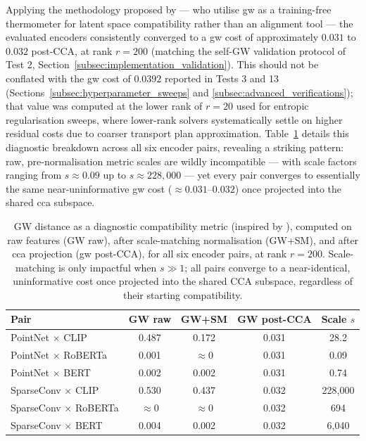 Applying the methodology proposed by \textcite{li2026scale} --- who utilise \gls{gw} as a training-free thermometer for latent space compatibility rather than an alignment tool --- the evaluated encoders consistently converged to a \gls{gw} cost of approximately $0.031$ to $0.032$ post-CCA, at rank $r=200$ (matching the self-GW validation protocol of Test 2, Section~\ref{subsec:implementation_validation}). This should not be conflated with the \gls{gw} cost of $0.0392$ reported in Tests 3 and 13 (Sections~\ref{subsec:hyperparameter_sweeps} and \ref{subsec:advanced_verifications}); that value was computed at the lower rank of $r=20$ used for entropic regularisation sweeps, where lower-rank solvers systematically settle on higher residual costs due to coarser transport plan approximation. Table~\ref{tab:gw-diagnostic} details this diagnostic breakdown across all six encoder pairs, revealing a striking pattern: raw, pre-normalisation metric scales are wildly incompatible --- with scale factors ranging from $s \approx 0.09$ up to $s \approx 228{,}000$ --- yet every pair converges to essentially the same near-uninformative \gls{gw} cost ($\approx 0.031$--$0.032$) once projected into the shared \gls{cca} subspace.

\begin{table}[H]
\centering
\begin{tabular}{lcccc}
\toprule
\textbf{Pair} & \textbf{GW raw} & \textbf{GW+SM} & \textbf{GW post-CCA} & \textbf{Scale $s$} \\
\midrule
PointNet $\times$ CLIP      & 0.487 & 0.172       & 0.031 & 28.2 \\
PointNet $\times$ RoBERTa   & 0.001 & $\approx 0$ & 0.031 & 0.09 \\
PointNet $\times$ BERT      & 0.002 & 0.002       & 0.031 & 0.74 \\
SparseConv $\times$ CLIP    & 0.530 & 0.437       & 0.032 & 228{,}000 \\
SparseConv $\times$ RoBERTa & $\approx 0$ & $\approx 0$ & 0.032 & 694 \\
SparseConv $\times$ BERT    & 0.004 & 0.002       & 0.032 & 6{,}040 \\
\bottomrule
\end{tabular}
\caption{GW distance as a diagnostic compatibility metric (inspired by
\textcite{li2026scale}), computed on raw features (GW raw), after
scale-matching normalisation (GW+SM), and after \gls{cca} projection (\gls{gw}
post-CCA), for all six encoder pairs, at rank $r=200$. Scale-matching is
only impactful when $s \gg 1$; all pairs converge to a near-identical,
uninformative cost once projected into the shared CCA subspace, regardless
of their starting compatibility.}
\label{tab:gw-diagnostic}
\end{table}

